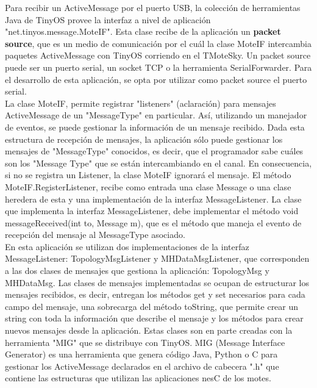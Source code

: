 
Para recibir un ActiveMessage por el puerto USB, la colección de herramientas Java de TinyOS provee la interfaz a nivel de aplicación "net.tinyos.message.MoteIF". Esta clase recibe de la aplicación un  \textbf{packet source}, que es un medio de comunicación por el cuál la clase MoteIF intercambia paquetes ActiveMessage con TinyOS corriendo en el TMoteSky. Un packet source puede ser un puerto serial, un socket TCP o la herramienta SerialForwarder. Para el desarrollo de esta aplicación, se opta por utilizar como packet source el puerto serial.\\

La clase MoteIF, permite registrar "listeners" (aclaración) para mensajes ActiveMessage de un "MessageType" en particular. Así, utilizando un manejador de eventos, se puede gestionar la información de un mensaje recibido. Dada esta estructura de recepción de mensajes, la aplicación sólo puede gestionar los mensajes de "MessageType" conocidos, es decir, que el programador sabe cuáles son los "Message Type" que se están intercambiando en el canal. En consecuencia, si no se registra un Listener, la clase MoteIF ignorará el mensaje. El método MoteIF.RegisterListener, recibe como entrada una clase Message o una clase heredera de esta y una implementación de la interfaz MessageListener. La clase que implementa la interfaz MessageListener, debe implementar el método void messageReceived(int to, Message m), que es el método que maneja el evento de recepción del mensaje al MessageType asociado.\\

En esta aplicación se utilizan dos implementaciones de la interfaz MessageListener: TopologyMsgListener y MHDataMsgListener, que corresponden a las dos clases de mensajes que gestiona la aplicación: TopologyMsg y MHDataMsg. Las clases de mensajes implementadas se ocupan de estructurar los mensajes recibidos, es decir, entregan los métodos get y set necesarios para cada campo del mensaje, una sobrecarga del método toString, que permite crear un string con toda la información que describe el mensaje y los métodos para crear nuevos mensajes desde la aplicación. Estas clases son en parte creadas con la herramienta "MIG" que se distribuye con TinyOS. MIG (Message Interface Generator) es una herramienta que genera código Java, Python o C para gestionar los ActiveMessage declarados en el archivo de cabecera ".h" que contiene las estructuras  que utilizan las aplicaciones nesC de los motes.\\

